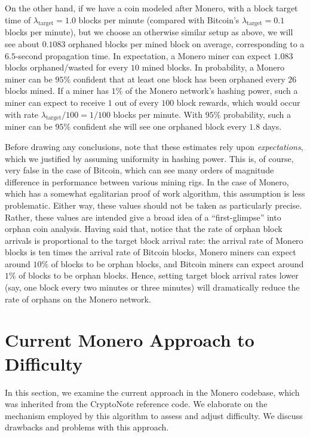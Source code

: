\documentclass[12pt,english]{mrl}
\theoremstyle{definition}
\numberwithin{equation}{section}
\numberwithin{figure}{section}
\numberwithin{equation}{section}
\numberwithin{equation}{section}
\numberwithin{figure}{section}
\begin{document}
On the other hand, if we have a coin modeled after Monero, with a block target time of $\lambda_{\text{target}}=1.0$ blocks per minute (compared with Bitcoin's $\lambda_{\text{target}} = 0.1$ blocks per minute), but we choose an otherwise similar setup as above, we will see about $0.1083$ orphaned blocks per mined block on average, corresponding to a $6.5$-second propagation time. In expectation, a Monero miner can expect $1.083$ blocks orphaned/wasted for every $10$ mined blocks. In probability, a Monero miner can be $95\%$ confident that at least one block has been orphaned every $26$ blocks mined. If a miner has $1\%$ of the Monero network's hashing power, such a miner can expect to receive $1$ out of every $100$ block rewards, which would occur with rate $\lambda_{\text{target}}/100 = 1/100$ blocks per minute. With $95\%$ probability, such a miner can be $95\%$ confident she will see one orphaned block every $1.8$ days.

Before drawing any conclusions, note that these estimates rely upon \textit{expectations}, which we justified by assuming uniformity in hashing power. This is, of course, very false in the case of Bitcoin, which can see many orders of magnitude difference in performance between various mining rigs. In the case of Monero, which has a somewhat egalitarian proof of work algorithm, this assumption is less problematic. Either way, these values should not be taken as particularly precise. Rather, these values are intended give a broad idea of a ``first-glimpse'' into orphan coin analysis. Having said that, notice that the rate of orphan block arrivals is proportional to the target block arrival rate: the arrival rate of Monero blocks is ten times the arrival rate of Bitcoin blocks, Monero miners can expect around $10\%$ of blocks to be orphan blocks, and Bitcoin miners can expect around $1\%$ of blocks to be orphan blocks. Hence, setting target block arrival rates lower (say, one block every two minutes or three minutes) will dramatically reduce the rate of orphans on the Monero network.



\section{Current Monero Approach to Difficulty }\label{currentApproach}
In this section, we examine the current approach in the Monero codebase, which was inherited from the CryptoNote reference code. We elaborate on the mechanism employed by this algorithm to assess and adjust difficulty. We discuss drawbacks and problems with this approach.
\end{document}
